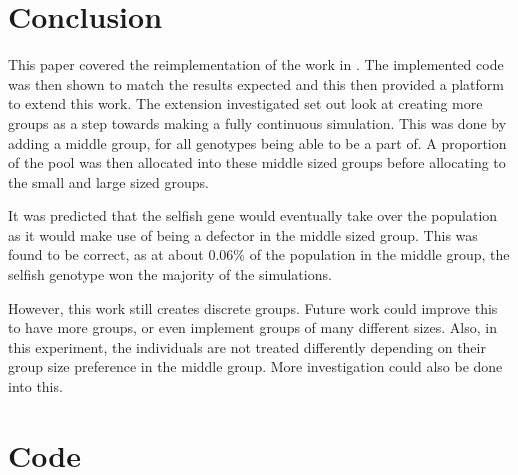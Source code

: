 \documentclass[11pt]{ecsarticle}
\begin{document}
\section{Conclusion}\label{sc:conclusion}

This paper covered the reimplementation of the work in \cite{powers2007individual}. 
The implemented code was then shown to match the results expected and this then provided a platform to extend this work. 
The extension investigated set out look at creating more groups as a step towards making a fully continuous simulation.
This was done by adding a middle group, for all genotypes being able to be a part of. 
A proportion of the pool was then allocated into these middle sized groups before allocating to the small and large sized groups.

It was predicted that the selfish gene would eventually take over the population as it would make use of being a defector in the middle sized group. 
This was found to be correct, as at about 0.06\% of the population in the middle group, the selfish genotype won the majority of the simulations.

However, this work still creates discrete groups. 
Future work could improve this to have more groups, or even implement groups of many different sizes.
Also, in this experiment, the individuals are not treated differently depending on their group size preference in the middle group.
More investigation could also be done into this.
\backmatter



 \appendix
 \clearpage

 \section{Code}
\end{document}
